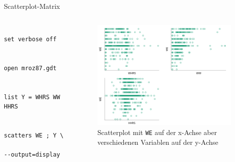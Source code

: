 \documentclass{beamer}[11pt]
\begin{document}
\begin{frame}[fragile]{Scatterplot-Matrix}
	\begin{columns}[T] %
		\small
		\begin{column}{.42\textwidth}
			\begin{verbatim}
				set verbose off

				open mroz87.gdt

				list Y = WHRS WW HHRS

				scatters WE ; Y \
				  --output=display
			\end{verbatim}
		\end{column}

		\begin{column}{.6\textwidth}
			\begin{figure}
				\includegraphics[width=1.0\textwidth]{../figures/scatters_matrix.png}
				\caption{Scatterplot mit \texttt{WE} auf der x-Achse aber verschiedenen Variablen auf der y-Achse}
			\end{figure}
	  \end{column}
	\end{columns}
\end{frame}
\end{document}
